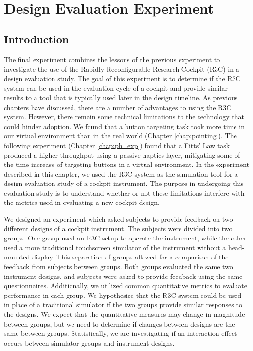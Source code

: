 \chapter{Design Evaluation Experiment}
\label{chap:de_exp}

\section{Introduction}

The final experiment combines the lessons of the previous experiment to investigate the use of the Rapidly Reconfigurable Research Cockpit (R3C) in a design evaluation study.
The goal of this experiment is to determine if the R3C system can be used in the evaluation cycle of a cockpit and provide similar results to a tool that is typically used later in the design timeline.
As previous chapters have discussed, there are a number of advantages to using the R3C system.
However, there remain some technical limitations to the technology that could hinder adoption.
We found that a button targeting task took more time in our virtual environment than in the real world (Chapter \ref{chap:pointing}).
The following experiment (Chapter \ref{chap:ph_exp}) found that a Fitts' Law task produced a higher throughput using a passive haptics layer, mitigating some of the time increase of targeting buttons in a virtual environment.
In the experiment described in this chapter, we used the R3C system as the simulation tool for a design evaluation study of a cockpit instrument.
The purpose in undergoing this evaluation study is to understand whether or not these limitations interfere with the metrics used in evaluating a new cockpit design.

We designed an experiment which asked subjects to provide feedback on two different designs of a cockpit instrument.
The subjects were divided into two groups.
One group used an R3C setup to operate the instrument, while the other used a more traditional touchscreen simulator of the instrument without a head-mounted display.
This separation of groups allowed for a comparison of the feedback from subjects between groups.
Both groups evaluated the same two instrument designs, and subjects were asked to provide feedback using the same questionnaires.
Additionally, we utilized common quantitative metrics to evaluate performance in each group.
We hypothesize that the R3C system could be used in place of a traditional simulator if the two groups provide similar responses to the designs.
We expect that the quantitative measures may change in magnitude between groups, but we need to determine if changes between designs are the same between groups.
Statistically, we are investigating if an interaction effect occurs between simulator groups and instrument designs.


